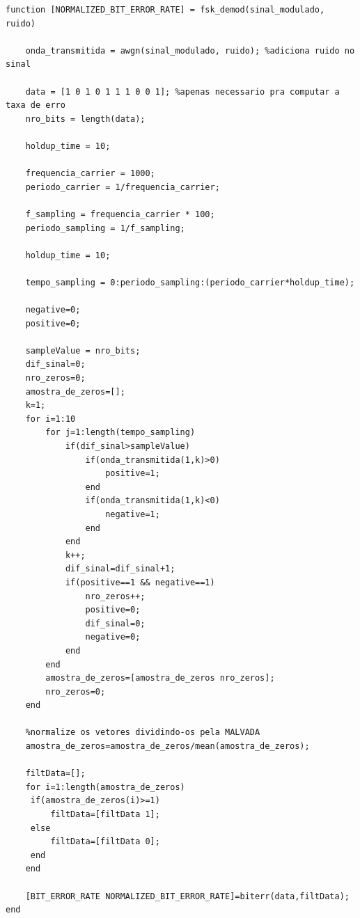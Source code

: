 \documentclass[10pt,a4paper]{report}
\begin{document}
	\begin{verbatim}
function [NORMALIZED_BIT_ERROR_RATE] = fsk_demod(sinal_modulado, ruido)

    onda_transmitida = awgn(sinal_modulado, ruido); %adiciona ruido no sinal

    data = [1 0 1 0 1 1 1 0 0 1]; %apenas necessario pra computar a taxa de erro
    nro_bits = length(data);

    holdup_time = 10;

    frequencia_carrier = 1000; 
    periodo_carrier = 1/frequencia_carrier;

    f_sampling = frequencia_carrier * 100;
    periodo_sampling = 1/f_sampling;

    holdup_time = 10;
    
    tempo_sampling = 0:periodo_sampling:(periodo_carrier*holdup_time);

    negative=0;
    positive=0;

    sampleValue = nro_bits;
    dif_sinal=0;
    nro_zeros=0;
    amostra_de_zeros=[];
    k=1;
    for i=1:10
        for j=1:length(tempo_sampling)
            if(dif_sinal>sampleValue)
                if(onda_transmitida(1,k)>0)
                    positive=1;    
                end
                if(onda_transmitida(1,k)<0)
                    negative=1;
                end
            end
            k++;
            dif_sinal=dif_sinal+1;
            if(positive==1 && negative==1)
                nro_zeros++;
                positive=0;
                dif_sinal=0;
                negative=0;
            end
        end
        amostra_de_zeros=[amostra_de_zeros nro_zeros];
        nro_zeros=0;     
    end

    %normalize os vetores dividindo-os pela MALVADA
    amostra_de_zeros=amostra_de_zeros/mean(amostra_de_zeros);

    filtData=[];
    for i=1:length(amostra_de_zeros)
     if(amostra_de_zeros(i)>=1)
         filtData=[filtData 1];
     else
         filtData=[filtData 0];
     end
    end

    [BIT_ERROR_RATE NORMALIZED_BIT_ERROR_RATE]=biterr(data,filtData);
end
	
	\end{verbatim}
	
\end{document}

